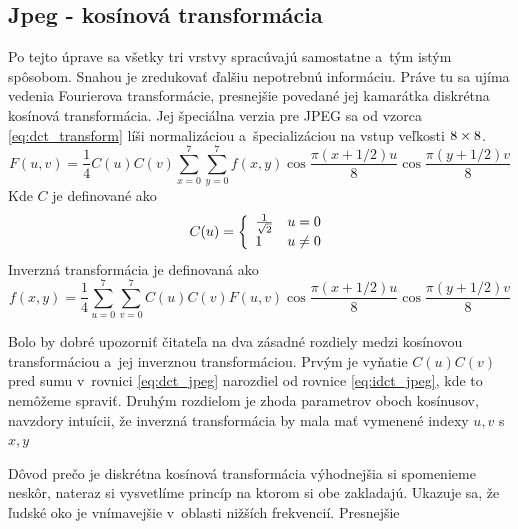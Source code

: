 \subsection{Jpeg - kosínová transformácia}

Po tejto úprave sa všetky tri vrstvy spracúvajú samostatne a~tým
istým spôsobom. Snahou je zredukovať ďalšiu nepotrebnú informáciu.
Práve tu sa ujíma vedenia Fourierova transformácie, presnejšie
povedané jej kamarátka diskrétna kosínová transformácia. Jej špeciálna
verzia pre JPEG sa od vzorca \ref{eq:dct_transform} 
líši normalizáciou a~špecializáciou na vstup veľkosti $8\times8$.
\begin{equation}
   F(u,v) = \frac{1}{4} C(u) C(v) 
    \sum_{x=0}^7 \sum_{y=0}^7 f(x,y)
        \cos\frac{\pi(x+1/2) u }{8}
        \cos\frac{\pi(y+1/2) v }{8}
    \label{eq:dct_jpeg}
\end{equation}
Kde $C$ je definované ako
\begin{equation*}
    C(u) = \left\{
        \begin{array}{l l}
            \frac{1}{\sqrt{2}} & u=0 \\
            1 & u\not=0
        \end{array}
        \right.
\end{equation*}
Inverzná transformácia je definovaná ako
\begin{equation}
    f(x,y) = \frac{1}{4} 
        \sum_{u=0}^7 \sum_{v=0}^7 C(u) C(v) F(u,v)
        \cos\frac{\pi(x+1/2) u}{8}
        \cos\frac{\pi(y+1/2) v}{8}
    \label{eq:idct_jpeg}
\end{equation}
\begin{poznamka}
    Bolo by dobré upozorniť čitateľa na dva zásadné rozdiely medzi
    kosínovou transformáciou a~jej inverznou transformáciou. Prvým je
    vyňatie $C(u) C(v)$ pred sumu v~rovnici \eqref{eq:dct_jpeg}
    narozdiel od rovnice \eqref{eq:idct_jpeg}, kde to nemôžeme spraviť.
    Druhým rozdielom je zhoda parametrov
    oboch kosínusov, navzdory intuícii, že inverzná transformácia by
    mala mať vymenené indexy $u,v$ s $x,y$
\end{poznamka}
Dôvod prečo je
diskrétna kosínová transformácia výhodnejšia si spomenieme neskôr,
nateraz si vysvetlíme princíp na ktorom si obe zakladajú. Ukazuje sa, že
ľudské oko je vnímavejšie v~oblasti nižších frekvencií. Presnejšie
